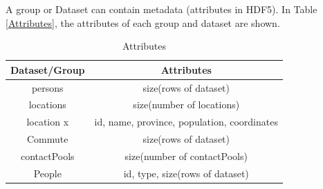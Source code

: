 \begin{table}[!htb]
\caption{\label{tab:pool}Dataset Persons}
\end{table}

A group or Dataset can contain metadata (attributes in HDF5). In Table \ref{Attributes}, the attributes of each group and dataset are shown.

\begin{table}[!htb]
\begin{center}
\begin{tabular}{|c|c|}
\hline
Dataset/Group   & Attributes \\ \hline
persons & size(rows of dataset)     \\ \hline 
locations & size(number of locations)     \\ \hline   
location x & id, name, province, population, coordinates     \\ \hline   
Commute & size(rows of dataset)     \\ \hline   
contactPools & size(number of contactPools)     \\ \hline   
People & id, type, size(rows of dataset)     \\ \hline   
\end{tabular}
\end{center}
\caption{\label{tab:commute}Attributes}
\end{table}
